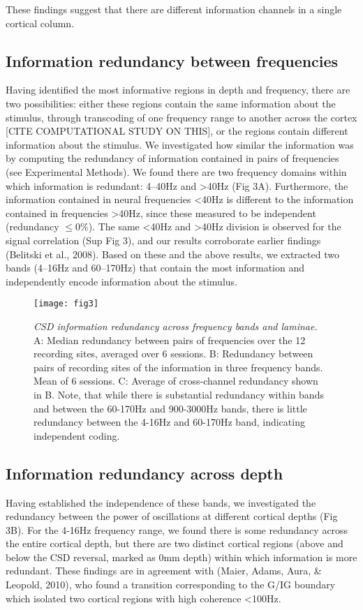 These findings suggest that there are different information channels in a single cortical column.

\subsection{Information redundancy between frequencies}
Having identified the most informative regions in depth and frequency, there are two possibilities: either these regions contain the same information about the stimulus, through transcoding of one frequency range to another across the cortex [CITE COMPUTATIONAL STUDY ON THIS], or the regions contain different information about the stimulus. We investigated how similar the information was by computing the redundancy of information contained in pairs of frequencies (see Experimental Methods). We found there are two frequency domains within which information is redundant: 4--40Hz and {\textgreater}40Hz (Fig 3A). Furthermore, the information contained in neural frequencies {\textless}40Hz is different to the information contained in frequencies {\textgreater}40Hz, since these measured to be independent (redundancy ${\leq}$0\%). The same {\textless}40Hz and {\textgreater}40Hz division is observed for the signal correlation (Sup Fig 3), and our results corroborate earlier findings (Belitski et al., 2008). Based on these and the above results, we extracted two bands (4--16Hz and 60--170Hz) that contain the most information and independently encode information about the stimulus.

\begin{figure}[htbp]
\centering \texttt{[image: fig3]}
%
\caption{%
\textit{\ac{CSD} information redundancy across frequency bands and laminae.}
A: Median redundancy between pairs of frequencies over the 12 recording 
sites, averaged over 6 sessions.
B: Redundancy between pairs of recording sites of the information in three 
frequency bands. Mean of 6 sessions.
C: Average of cross-channel redundancy shown in B.
Note, that while there is substantial redundancy within bands and between the 
60-170Hz and 900-3000Hz bands, there is little redundancy between the 4-16Hz and
60-170Hz band, indicating independent coding.}%
\label{fig:lam_3}
%
\end{figure}

\subsection{Information redundancy across depth}
Having established the independence of these bands, we investigated the redundancy between the power of oscillations at different cortical depths (Fig 3B). For the 4-16Hz frequency range, we found there is some redundancy across the entire cortical depth, but there are two distinct cortical regions (above and below the \ac{CSD} reversal, marked as 0mm depth) within which information is more redundant. These findings are in agreement with (Maier, Adams, Aura, \& Leopold, 2010), who found a transition corresponding to the \ac{G}/\ac{IG} boundary which isolated two cortical regions with high coherence {\textless}100Hz.

